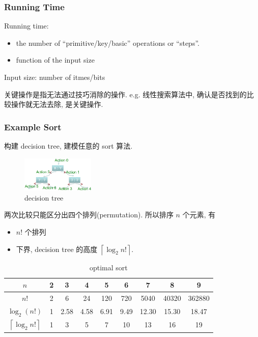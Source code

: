 \subsubsection{Running Time}
\begin{definition}
    Running time: 
    \begin{itemize}
        \item the number of ``primitive/key/basic'' operations or ``steps''. 
        \item function of the input size 
    \end{itemize}
\end{definition}
Input size: number of itmes/bits

关键操作是指无法通过技巧消除的操作. e.g. 线性搜索算法中, 确认是否找到的比较操作就无法去除, 是关键操作. 

\subsubsection{Example Sort}
构建 decision tree, 建模任意的 sort 算法. 

\begin{figure}[H]
    \centering
    \includegraphics[width=0.309\textwidth]{pic/DAA1/decision tree}
    \caption{decision tree}
\end{figure}

两次比较只能区分出四个排列(permutation). 所以排序 $n$ 个元素, 有
\begin{itemize}
    \item $n!$ 个排列
    \item 下界, decision tree 的高度 $\left\lceil \log_2 n! \right\rceil$. 
\end{itemize}


\begin{table}[H]
    \centering
    \caption{optimal sort}
    {\scriptsize
    \begin{tabular}[c]{ccccccccc}\toprule 
        $n$ & 2 & 3    & 4    & 5    & 6    & 7     & 8     & 9      \\ \midrule
        $n!$ & 2 & 6    & 24   & 120  & 720  & 5040  & 40320 & 362880 \\ \cmidrule{1-1}
        $\log_2(n!)$ & 1 & 2.58 & 4.58 & 6.91 & 9.49 & 12.30 & 15.30 & 18.47  \\ \cmidrule{1-1}
        $\left\lceil \log_2 n! \right\rceil$ & 1 & 3    & 5    & 7    & 10   & 13    & 16    & 19     \\
        \bottomrule
    \end{tabular}
    }
\end{table}


